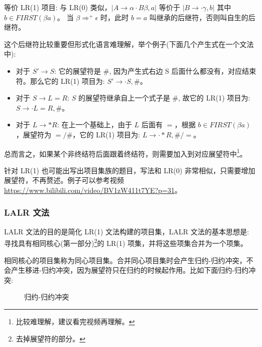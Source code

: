 等价 LR(1) 项目: 与 LR(0) 类似，$|A \rightarrow \alpha \cdot B\beta ,a|$ 等价于 $|B\rightarrow \cdot \gamma, b|$ 其中 $b \in FIRST(\beta a)$。 当 $\beta \Rightarrow^{+} \epsilon$ 时，此时 $b=a$ 叫继承的后继符，否则叫自生的后继符。

这个后继符比较重要但形式化语言难理解，举个例子(下面几个产生式在一个文法中):
\begin{itemize}
    \item 对于 $S' \rightarrow S$: 它的展望符是 \#, 因为产生式右边 S 后面什么都没有，对应结束符。那么它的 LR(1) 项目为: $S' \rightarrow \cdot S, \#$。
    \item 对于 $S \rightarrow L=R$: $S$ 的展望符继承自上一个式子是 \#, 故它的 LR(1) 项目为: $S \rightarrow \cdot L=R, \#$。
    \item 对于 $L \rightarrow *R$: 在上一个基础上，由于 $L$ 后面有 $=$，根据 $b \in FIRST(\beta a)$，展望符为 $=/\#$，它的 LR(1) 项目为: $L \rightarrow \cdot *R , \#/=$。
\end{itemize}

总而言之，如果某个非终结符后面跟着终结符，则需要加入到对应展望符中\footnote{比较难理解，建议看完视频再理解。}。

针对 LR(1) 也可能出写出项目集族的题目，写法和 LR(0) 非常相似，只需要增加展望符，不再赘述。例子可以参考视频 \url{https://www.bilibili.com/video/BV1zW411t7YE?p=31}。

\subsubsection{\textcolor{imp}{LALR 文法}}

LALR 文法的目的是简化 LR(1) 文法构建的项目集，LALR 文法的基本思想是: 寻找具有相同核心(第一部分)\footnote{去掉展望符的部分。}的 LR(1) 项集，并将这些项集合并为一个项集。

相同核心的项目集称为同心项目集。合并同心项目集时会产生\textcolor{imp}{归约-归约}冲突，不会产生移进-归约冲突，因为展望符只在归约的时候起作用。比如下面归约-归约冲突:

\begin{figure}[H]
    \centering
    \caption{归约-归约冲突}
    \label{fig:归约-归约冲突}
\end{figure}

